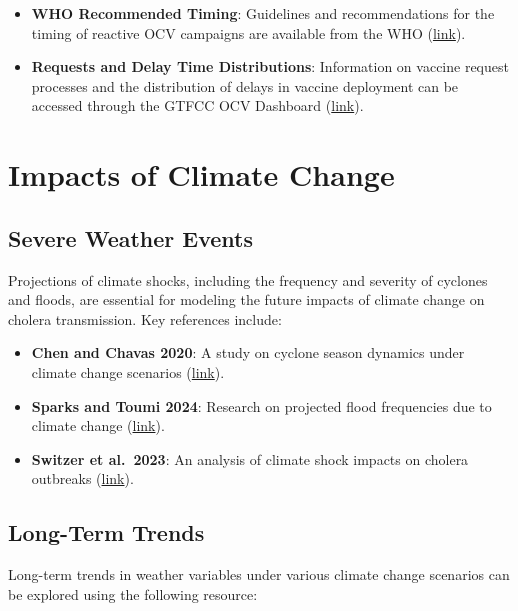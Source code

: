 \documentclass[
]{book}
\providecommand{\tightlist}{%
  \setlength{\itemsep}{0pt}\setlength{\parskip}{0pt}}
\begin{document}
\begin{itemize}
\tightlist
\item
  \textbf{WHO Recommended Timing}: Guidelines and recommendations for the timing of reactive OCV campaigns are available from the WHO (\href{https://www.who.int/groups/icg/cholera/stockpiles}{link}).
\item
  \textbf{Requests and Delay Time Distributions}: Information on vaccine request processes and the distribution of delays in vaccine deployment can be accessed through the GTFCC OCV Dashboard (\href{https://apps.epicentre-msf.org/public/app/gtfcc}{link}).
\end{itemize}

\section{Impacts of Climate Change}\label{impacts-of-climate-change-1}

\subsection{Severe Weather Events}\label{severe-weather-events}

Projections of climate shocks, including the frequency and severity of cyclones and floods, are essential for modeling the future impacts of climate change on cholera transmission. Key references include:

\begin{itemize}
\tightlist
\item
  \textbf{Chen and Chavas 2020}: A study on cyclone season dynamics under climate change scenarios (\href{https://journals.ametsoc.org/view/journals/atsc/77/8/jasD190320.xml}{link}).
\item
  \textbf{Sparks and Toumi 2024}: Research on projected flood frequencies due to climate change (\href{https://www.nature.com/articles/s41597-024-03250-y}{link}).
\item
  \textbf{Switzer et al.~2023}: An analysis of climate shock impacts on cholera outbreaks (\href{https://www.nature.com/articles/s43247-023-00844-z}{link}).
\end{itemize}

\subsection{Long-Term Trends}\label{long-term-trends}

Long-term trends in weather variables under various climate change scenarios can be explored using the following resource:
\end{document}
